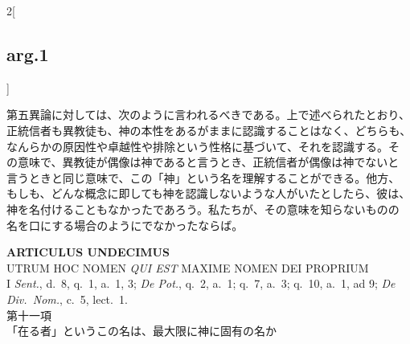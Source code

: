 \documentclass[paper=a4paper,fontsize=10pt,jafontsize=9pt,titlepage]{jlreq}
\begin{document}
\begin{paracol}{2}[\subsection{arg.1}]
\switchcolumn

第五異論に対しては、次のように言われるべきである。上で述べられたとおり、
正統信者も異教徒も、神の本性をあるがままに認識することはなく、どちらも、
なんらかの原因性や卓越性や排除という性格に基づいて、それを認識する。そ
の意味で、異教徒が偶像は神であると言うとき、正統信者が偶像は神でないと
言うときと同じ意味で、この「神」という名を理解することができる。他方、
もしも、どんな概念に即しても神を認識しないような人がいたとしたら、彼は、
神を名付けることもなかったであろう。私たちが、その意味を知らないものの
名を口にする場合のようにでなかったならば。

\end{paracol}
\newpage
{}

\begin{center}
{\Large {\bfseries ARTICULUS UNDECIMUS}}\\
{\large UTRUM HOC NOMEN {\itshape QUI EST} MAXIME NOMEN DEI PROPRIUM}\\
{\footnotesize I {\itshape Sent.}, d.~8, q.~1, a.~1, 3; {\itshape De
Pot.}, q.~2, a.~1; q.~7, a.~3; q.~10, a.~1, ad 9; {\itshape De
Div.~Nom.}, c.~5, lect.~1.}\\
{\Large 第十一項\\「在る者」というこの名は、最大限に神に固有の名か}
\end{center}

{}
\setcounter{section}{11}
\setcounter{subsection}{0}
\end{document}
